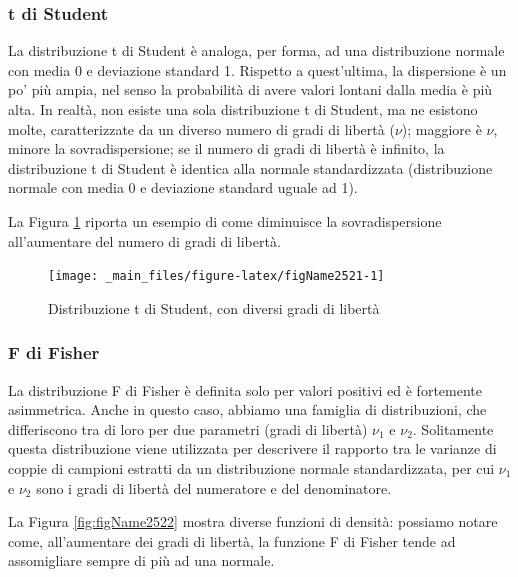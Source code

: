 \documentclass[a4paper,12pt,oneside]{book}
\begin{document}
\hypertarget{t-di-student}{%
\subsubsection{t di Student}\label{t-di-student}}

La distribuzione t di Student è analoga, per forma, ad una distribuzione normale con media 0 e deviazione standard 1. Rispetto a quest'ultima, la dispersione è un po' più ampia, nel senso la probabilità di avere valori lontani dalla media è più alta. In realtà, non esiste una sola distribuzione t di Student, ma ne esistono molte, caratterizzate da un diverso numero di gradi di libertà (\(\nu\)); maggiore è \(\nu\), minore la sovradispersione; se il numero di gradi di libertà è infinito, la distribuzione t di Student è identica alla normale standardizzata (distribuzione normale con media 0 e deviazione standard uguale ad 1).

La Figura \ref{fig:figName2521} riporta un esempio di come diminuisce la sovradispersione all'aumentare del numero di gradi di libertà.

\begin{figure}

{\centering \texttt{[image: \_main\_files/figure-latex/figName2521-1]} 

}

\caption{Distribuzione t di Student, con diversi gradi di libertà}\label{fig:figName2521}
\end{figure}

\hypertarget{f-di-fisher}{%
\subsubsection{F di Fisher}\label{f-di-fisher}}

La distribuzione F di Fisher è definita solo per valori positivi ed è fortemente asimmetrica. Anche in questo caso, abbiamo una famiglia di distribuzioni, che differiscono tra di loro per due parametri (gradi di libertà) \(\nu_1\) e \(\nu_2\). Solitamente questa distribuzione viene utilizzata per descrivere il rapporto tra le varianze di coppie di campioni estratti da un distribuzione normale standardizzata, per cui \(\nu_1\) e \(\nu_2\) sono i gradi di libertà del numeratore e del denominatore.

La Figura \ref{fig:figName2522} mostra diverse funzioni di densità: possiamo notare come, all'aumentare dei gradi di libertà, la funzione F di Fisher tende ad assomigliare sempre di più ad una normale.
\end{document}
